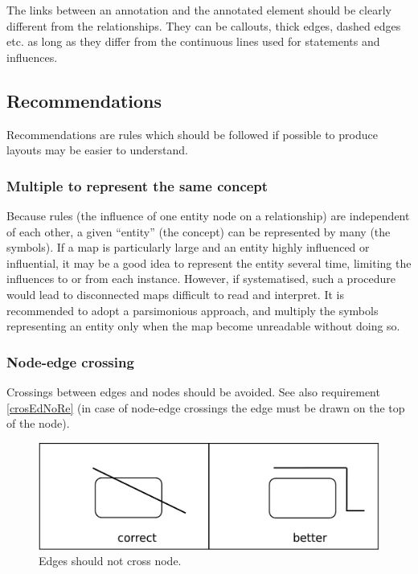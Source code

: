 The links between an annotation and the annotated element should be clearly different from the relationships. They can be callouts, thick edges, dashed edges etc. as long as they differ from the continuous lines used for statements and influences.

\subsection{Recommendations}

Recommendations are rules which should be followed if possible to produce layouts may be easier to understand.

\subsubsection{Multiple  to represent the same concept}\label{multEnt}

Because rules (the influence of one entity node on a relationship) are independent of each other, a given ``entity'' (the concept) can be represented by many  (the symbols). If a map is particularly large and an entity highly influenced or influential, it may be a good idea to represent the entity several time, limiting the influences to or from each instance. However, if systematised, such a procedure would lead to disconnected maps difficult to read and interpret. It is recommended to adopt a parsimonious approach, and multiply the symbols representing an entity only when the map become unreadable without doing so.

\subsubsection{Node-edge crossing}\label{crosEdNo}

Crossings between edges and nodes should be avoided. See also requirement \ref{crosEdNoRe} (in case of node-edge crossings the edge must be drawn on the top of the node).

\begin{figure}[h!]
  \centering
  \includegraphics[scale=0.3]{images/layout-node-edge-2}
  \caption{Edges should not cross node.}\label{fig:layout7}
\end{figure}


